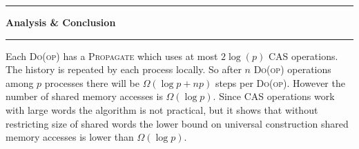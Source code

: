 \documentclass[10pt]{article}
\newcommand\question[1]{\vspace{1.2em}\hrule\textbf{ #1}\vspace{.5em}\hrule}
\theoremstyle{definition}
\begin{document}
\question{Analysis \& Conclusion}
  Each \textsc{Do(\textnormal{op})} has a \textsc{Propagate} which uses at most $2\log(p)$ \textsc{CAS} operations. The history is repeated by each process locally. So after $n$ \textsc{Do(\textnormal{op})} operations among $p$ processes there will be $\Omega(\log p + np)$ steps per \textsc{Do(\textnormal{op})}. However the number of shared memory accesses is $\Omega(\log p)$. Since CAS operations work with large words the algorithm is not practical, but it shows that  without restricting size of shared words the lower bound on universal construction shared memory accesses is lower than $\Omega(\log p)$.
\end{document}
